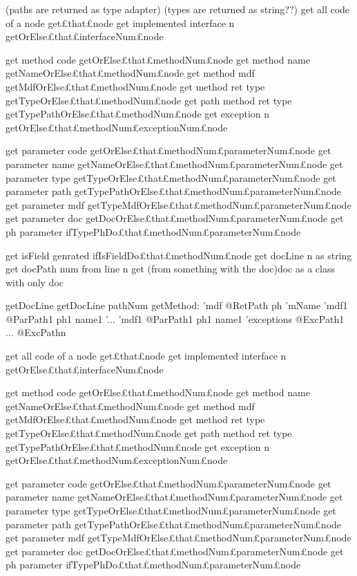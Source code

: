 \begin{RuleFrame}


(paths are returned as type adapter)
(types are returned as string??)
get all code of a node			get£that£node
get implemented interface n  	getOrElse£that£interfaceNum£node

get method code				getOrElse£that£methodNum£node
get method name				getNameOrElse£that£methodNum£node
get method mdf				getMdfOrElse£that£methodNum£node
get method ret type			getTypeOrElse£that£methodNum£node
get path method ret type		getTypePathOrElse£that£methodNum£node
get exception n 				getOrElse£that£methodNum£exceptionNum£node

get parameter code			getOrElse£that£methodNum£parameterNum£node
get parameter name			getNameOrElse£that£methodNum£parameterNum£node
get parameter type				getTypeOrElse£that£methodNum£parameterNum£node
get parameter path				getTypePathOrElse£that£methodNum£parameterNum£node
get parameter mdf				getTypeMdfOrElse£that£methodNum£parameterNum£node
get parameter doc				getDocOrElse£that£methodNum£parameterNum£node
get ph parameter				ifTypePhDo£that£methodNum£parameterNum£node

get isField	genrated			ifIsFieldDo£that£methodNum£node
get docLine n as string
get docPath num from line n
get (from something with the doc)doc as a class with only doc 

getDocLine
getDocLine pathNum
getMethod:
'mdf @RetPath ph
'mName
'mdf1 @ParPath1 ph1 name1
'...
'mdf1 @ParPath1 ph1 name1
'exceptions
@ExcPath1
...
@ExcPathn

get all code of a node			get£that£node
get implemented interface n  	getOrElse£that£interfaceNum£node

get method code				getOrElse£that£methodNum£node
get method name				getNameOrElse£that£methodNum£node
get method mdf				getMdfOrElse£that£methodNum£node
get method ret type			getTypeOrElse£that£methodNum£node
get path method ret type		getTypePathOrElse£that£methodNum£node
get exception n 				getOrElse£that£methodNum£exceptionNum£node

get parameter code			getOrElse£that£methodNum£parameterNum£node
get parameter name			getNameOrElse£that£methodNum£parameterNum£node
get parameter type				getTypeOrElse£that£methodNum£parameterNum£node
get parameter path				getTypePathOrElse£that£methodNum£parameterNum£node
get parameter mdf				getTypeMdfOrElse£that£methodNum£parameterNum£node
get parameter doc				getDocOrElse£that£methodNum£parameterNum£node
get ph parameter				ifTypePhDo£that£methodNum£parameterNum£node


\end{RuleFrame}
